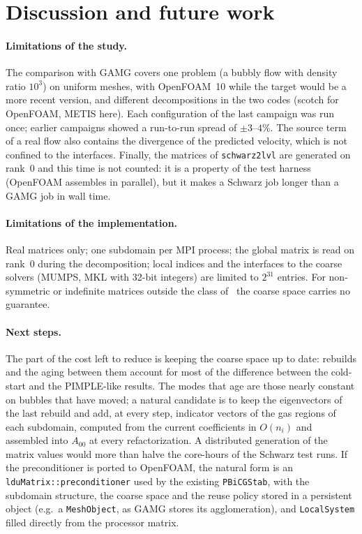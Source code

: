 \documentclass[11pt,a4paper]{article}
\begin{document}
\section{Discussion and future work}\label{sec:discussion}

\paragraph{Limitations of the study.} The comparison with GAMG covers one problem (a bubbly flow with density
ratio $10^3$) on uniform meshes, with OpenFOAM~10 while the target would be a more recent version, and different
decompositions in the two codes (scotch for OpenFOAM, METIS here). Each configuration of the last campaign was
run once; earlier campaigns showed a run-to-run spread of $\pm3$--$4\%$. The source term of a real flow also
contains the divergence of the predicted velocity, which is not confined to the interfaces. Finally, the
matrices of \texttt{schwarz2lvl} are generated on rank~0 and this time is not counted: it is a property of the
test harness (OpenFOAM assembles in parallel), but it makes a Schwarz job longer than a GAMG job in wall time.

\paragraph{Limitations of the implementation.} Real matrices only; one subdomain per MPI process; the global
matrix is read on rank~0 during the decomposition; local indices and the interfaces to the coarse solvers
(MUMPS, MKL with 32-bit integers) are limited to $2^{31}$ entries. For non-symmetric or indefinite matrices outside the class of~\cite{AlDaas2023} the coarse
space carries no guarantee.

\paragraph{Next steps.} The part of the cost left to reduce is keeping the coarse space up to date: rebuilds
and the aging between them account for most of the difference between the cold-start and the PIMPLE-like
results. The modes that age are those nearly constant on bubbles that have moved; a natural candidate is to
keep the eigenvectors of the last rebuild and add, at every step, indicator vectors of the gas regions of each
subdomain, computed from the current coefficients in $O(n_i)$ and assembled into $A_{00}$ at every
refactorization. A distributed generation of the matrix values would more than halve the core-hours of the Schwarz test runs. If the
preconditioner is ported to OpenFOAM, the natural form is an \texttt{lduMatrix::preconditioner} used by the
existing \texttt{PBiCGStab}, with the subdomain structure, the coarse space and the reuse policy stored in a
persistent object (e.g.\ a \texttt{MeshObject}, as GAMG stores its agglomeration), and \texttt{LocalSystem}
filled directly from the processor matrix.
\end{document}
